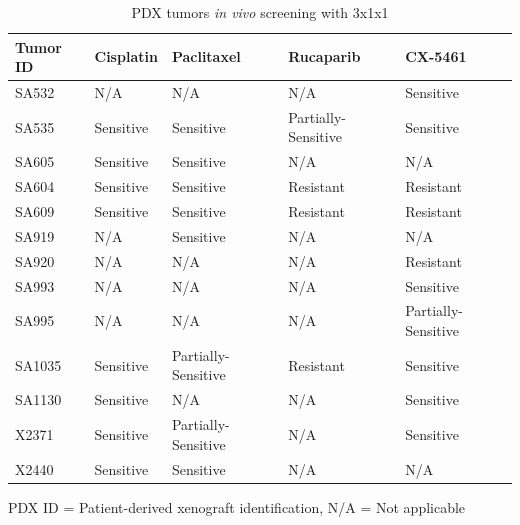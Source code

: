 \begin{table}[htbp]
  \centering
  \caption{PDX tumors \textit{in vivo} screening with 3x1x1}
    \begin{tabular}{lllll}
    
     \hline
    \textbf{Tumor ID} & \textbf{Cisplatin} & \textbf{Paclitaxel} & \textbf{Rucaparib} & \textbf{CX-5461} \\
     \hline
    SA532 & N/A   & N/A   & N/A   & Sensitive \\
    SA535 & Sensitive & Sensitive & Partially-Sensitive & Sensitive \\
    SA605 & Sensitive & Sensitive & N/A   & N/A \\
    SA604 & Sensitive & Sensitive & Resistant & Resistant \\
    SA609 & Sensitive & Sensitive & Resistant & Resistant \\
    SA919 & N/A   & Sensitive & N/A   & N/A \\
    SA920 & N/A   & N/A   & N/A   & Resistant \\
    SA993 & N/A   & N/A   & N/A   & Sensitive \\
    SA995 & N/A   & N/A   & N/A   & Partially-Sensitive \\
    SA1035 & Sensitive & Partially-Sensitive & Resistant & Sensitive \\
    SA1130 & Sensitive & N/A   & N/A   & Sensitive \\
    X2371 & Sensitive & Partially-Sensitive & N/A   & Sensitive \\
    X2440 & Sensitive & Sensitive & N/A   & N/A \\
     \hline
    \end{tabular}%
    
PDX ID = Patient-derived xenograft identification, N/A = Not applicable\\
  \label{tab:PDXtumorsinvivo}%
\end{table}%



